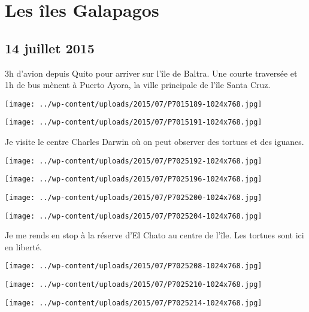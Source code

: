 \chapter{Les îles Galapagos}
\section*{14 juillet 2015}
3h d'avion depuis Quito pour arriver sur l'île de Baltra. Une courte traversée et 1h de bus mènent à Puerto Ayora, la ville principale de l'île Santa Cruz. \newline
 \newline
\centerline{\texttt{[image: ../wp-content/uploads/2015/07/P7015189-1024x768.jpg]} } 
 \newline
 \newline
\centerline{\texttt{[image: ../wp-content/uploads/2015/07/P7015191-1024x768.jpg]} } 
 \newline
 Je visite le centre Charles Darwin où on peut observer des tortues et des iguanes. \newline
 \newline
\centerline{\texttt{[image: ../wp-content/uploads/2015/07/P7025192-1024x768.jpg]} } 
 \newline
 \newline
\centerline{\texttt{[image: ../wp-content/uploads/2015/07/P7025196-1024x768.jpg]} } 
 \newline
 \newline
\centerline{\texttt{[image: ../wp-content/uploads/2015/07/P7025200-1024x768.jpg]} } 
 \newline
 \newline
\centerline{\texttt{[image: ../wp-content/uploads/2015/07/P7025204-1024x768.jpg]} } 
 \newline
 Je me rends en stop à la réserve d'El Chato au centre de l'île. Les tortues sont ici en liberté. \newline
 \newline
\centerline{\texttt{[image: ../wp-content/uploads/2015/07/P7025208-1024x768.jpg]} } 
 \newline
 \newline
\centerline{\texttt{[image: ../wp-content/uploads/2015/07/P7025210-1024x768.jpg]} } 
 \newline
 \newline
\centerline{\texttt{[image: ../wp-content/uploads/2015/07/P7025214-1024x768.jpg]} } 
 \newline
